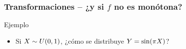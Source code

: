 \documentclass[table]{beamer}
\begin{document}
\begin{frame}
    \frametitle{Transformaciones -- ¿y si $f$ no es monótona?}
    \begin{exampleblock}{Ejemplo}
        \begin{itemize}
            \item Si $X \sim \uniform{0}{1}$, ¿cómo se distribuye $Y = \sin \parens{\pi X}$?
        \end{itemize}
    \end{exampleblock}
    \begin{center}
    \end{center}
\end{frame}
\end{document}

